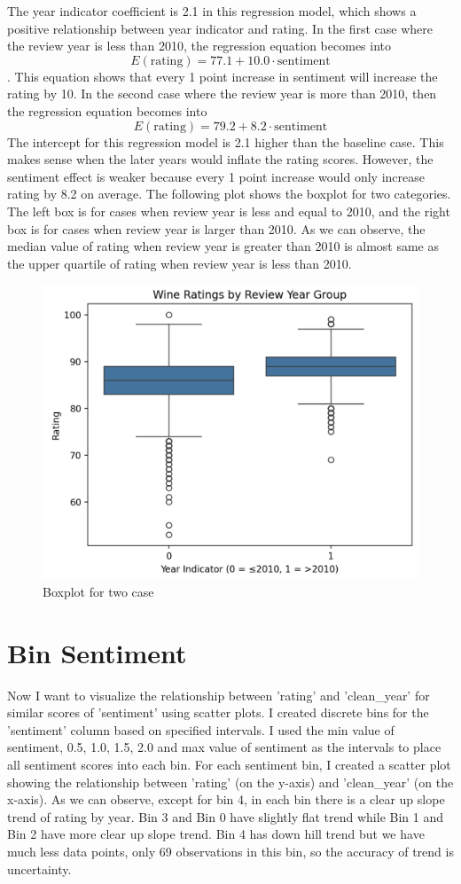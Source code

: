 \documentclass{article}
\begin{document}
The year indicator coefficient is 2.1 in this regression model, which shows a positive relationship between year indicator and rating. In the first case where the review year is less than 2010, the regression equation becomes into $$E(\text{rating}) = 77.1 + 10.0 \cdot \text{sentiment}$$. This equation shows that every 1 point increase in sentiment will increase the rating by 10. In the second case where the review year is more than 2010, then the regression equation becomes into $$E(\text{rating}) = 79.2 + 8.2\cdot \text{sentiment}$$ The intercept for this regression model is 2.1 higher than the baseline case. This makes sense when the later years would inflate the rating scores. However, the sentiment effect is weaker because every 1 point increase would only increase rating by 8.2 on average. 
The following plot shows the boxplot for two categories. The left box is for cases when review year is less and equal to 2010, and the right box is for cases when review year is larger than 2010. As we can observe, the median value of rating when review year is greater than 2010 is almost same as the upper quartile of rating when review year is less than 2010. 

\begin{figure}
    \centering
    \includegraphics[width=0.5\linewidth]{box.png}
    \caption{Boxplot for two case}
    \label{fig:placeholder}
\end{figure}

\section{Bin Sentiment}
Now I want to visualize the relationship between 'rating' and 'clean\_year' for similar scores of 'sentiment' using scatter plots. I created discrete bins for the 'sentiment' column based on specified intervals. I used the min value of sentiment, 0.5, 1.0, 1.5, 2.0 and max value of sentiment as the intervals to place all sentiment scores into each bin. For each sentiment bin, I created a scatter plot showing the relationship between 'rating' (on the y-axis) and 'clean\_year' (on the x-axis). As we can observe, except for bin 4, in each bin there is a clear up slope trend of rating by year. Bin 3 and Bin 0 have slightly flat trend while Bin 1 and Bin 2 have more clear up slope trend. Bin 4 has down hill trend but we have much less data points, only 69 observations in this bin, so the accuracy of trend is uncertainty. 
\end{document}
